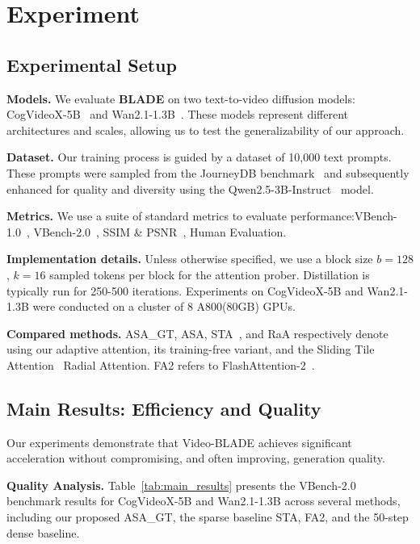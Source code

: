 \documentclass[letterpaper]{article} %
\begin{document}
\section{Experiment}
\subsection{Experimental Setup}
\textbf{Models.} We evaluate \textbf{BLADE} on two text-to-video diffusion models: CogVideoX-5B~\cite{hong2022cogvideo} and Wan2.1-1.3B~\cite{wan2025}. These models represent different architectures and scales, allowing us to test the generalizability of our approach.

\noindent\textbf{Dataset.} Our training process is guided by a dataset of 10,000 text prompts. These prompts were sampled from the JourneyDB benchmark~\cite{sun2023journeydbbenchmarkgenerativeimage} and subsequently enhanced for quality and diversity using the Qwen2.5-3B-Instruct~\cite{qwen2.5} model.

\noindent\textbf{Metrics.} We use a suite of standard metrics to evaluate performance:VBench-1.0~\cite{huang2023vbench}, VBench-2.0~\cite{zheng2025vbench2}, SSIM \& PSNR~\cite{5596999}, Human Evaluation.

\noindent\textbf{Implementation details.} Unless otherwise specified, we use a block size $b=128$, $k=16$ sampled tokens per block for the attention prober. Distillation is typically run for 250-500 iterations. Experiments on CogVideoX-5B and Wan2.1-1.3B were conducted on a cluster of 8 A800(80GB) GPUs.

\noindent\textbf{Compared methods.} ASA\_GT, ASA,  STA~\cite{zhang2025fastvideogenerationsliding}, and RaA respectively denote using our adaptive attention, its training-free variant, and the Sliding Tile Attention~\cite{zhang2025fastvideogenerationsliding} Radial Attention\cite{li2025radialattentiononlogn}. FA2 refers to FlashAttention-2~\cite{dao2024flashattention}.




\subsection{Main Results: Efficiency and Quality}
Our experiments demonstrate that Video-BLADE achieves significant acceleration without compromising, and often improving, generation quality.

\noindent\textbf{Quality Analysis.}
Table~\ref{tab:main_results} presents the VBench-2.0 benchmark results for CogVideoX-5B and Wan2.1-1.3B across several methods, including our proposed ASA\_GT, the sparse baseline STA, FA2, and the 50-step dense baseline.
\end{document}
